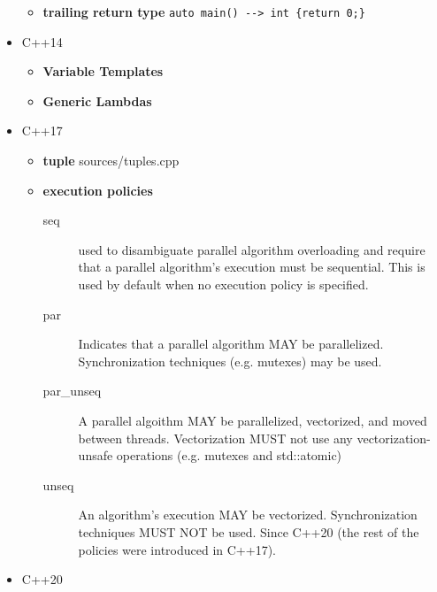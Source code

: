 \documentclass{article}
\begin{document}
\begin{itemize}
\begin{itemize}
            \item \textbf{trailing return type}
              \verb!auto main() --> int {return 0;}!
          \end{itemize}
        \item C++14
          \begin{itemize}
            \item \textbf{Variable Templates}
            \item \textbf{Generic Lambdas}
          \end{itemize}
        \item C++17
          \begin{itemize}
            \item \textbf{tuple}
               {sources/tuples.cpp}
            \item \textbf{execution policies}
              \begin{description}
                \item[seq]
                  used to disambiguate parallel algorithm overloading and require that a parallel algorithm's execution must be sequential. This is used by default when no execution policy is specified.
              \end{description}
              \begin{description}
                \item[par]
                  Indicates that a parallel algorithm MAY be parallelized. Synchronization techniques (e.g. mutexes) may be used.
              \end{description}
              \begin{description}
                \item[par\_unseq]
                  A parallel algoithm MAY be parallelized, vectorized, and moved between threads. Vectorization MUST not use any vectorization-unsafe operations (e.g. mutexes and std::atomic)
              \end{description}
              \begin{description}
                \item[unseq]
                  An algorithm's execution MAY be vectorized. Synchronization techniques MUST NOT be used. Since C++20 (the rest of the policies were introduced in C++17).
              \end{description}
          \end{itemize}
        \item C++20
          \begin{itemize}

\end{itemize}
\end{itemize}
\end{document}
